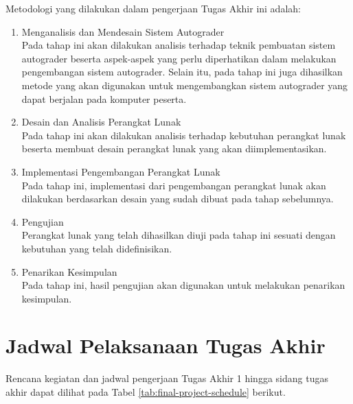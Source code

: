 \par Metodologi yang dilakukan dalam pengerjaan Tugas Akhir ini adalah:
\begin{enumerate}
	\item Menganalisis dan Mendesain Sistem Autograder \\ Pada tahap ini akan dilakukan analisis terhadap teknik pembuatan sistem autograder beserta aspek-aspek yang perlu diperhatikan dalam melakukan pengembangan sistem autograder. Selain itu, pada tahap ini juga dihasilkan metode yang akan digunakan untuk mengembangkan sistem autograder yang dapat berjalan pada komputer peserta.
	\item Desain dan Analisis Perangkat Lunak \\ Pada tahap ini akan dilakukan analisis terhadap kebutuhan perangkat lunak beserta membuat desain perangkat lunak yang akan diimplementasikan.
	\item Implementasi Pengembangan Perangkat Lunak \\ Pada tahap ini, implementasi dari pengembangan perangkat lunak akan dilakukan berdasarkan desain yang sudah dibuat pada tahap sebelumnya.
	\item Pengujian \\ Perangkat lunak yang telah dihasilkan diuji pada tahap ini sesuati dengan kebutuhan yang telah didefinisikan.
	\item Penarikan Kesimpulan \\ Pada tahap ini, hasil pengujian akan digunakan untuk melakukan penarikan kesimpulan.
\end{enumerate}

\section{Jadwal Pelaksanaan Tugas Akhir}

\par Rencana kegiatan dan jadwal pengerjaan Tugas Akhir 1 hingga sidang tugas akhir dapat dilihat pada Tabel \ref{tab:final-project-schedule} berikut.

